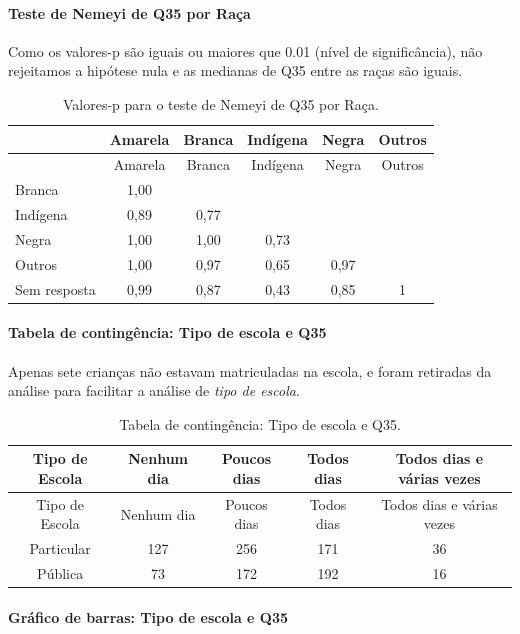 \documentclass[]{article}
\let\oldparagraph\paragraph
\renewcommand{\paragraph}[1]{\oldparagraph{#1}\mbox{}}
\begin{document}
\hypertarget{teste-de-nemeyi-de-q35-por-rauxe7a}{%
\paragraph{Teste de Nemeyi de Q35 por Raça}\label{teste-de-nemeyi-de-q35-por-rauxe7a}}

Como os valores-p são iguais ou maiores que 0.01 (nível de significância), não rejeitamos a hipótese nula e as medianas de Q35 entre as raças são iguais.

\begin{longtable}[]{@{}lccccc@{}}
\caption{\label{tab:unnamed-chunk-1291}Valores-p para o teste de Nemeyi de Q35 por Raça.}\tabularnewline
\toprule
& Amarela & Branca & Indígena & Negra & Outros\tabularnewline
\midrule
\endfirsthead
\toprule
& Amarela & Branca & Indígena & Negra & Outros\tabularnewline
\midrule
\endhead
Branca & 1,00 & & & &\tabularnewline
Indígena & 0,89 & 0,77 & & &\tabularnewline
Negra & 1,00 & 1,00 & 0,73 & &\tabularnewline
Outros & 1,00 & 0,97 & 0,65 & 0,97 &\tabularnewline
Sem resposta & 0,99 & 0,87 & 0,43 & 0,85 & 1\tabularnewline
\bottomrule
\end{longtable}

\cleardoublepage

\hypertarget{tabela-de-continguxeancia-tipo-de-escola-e-q35}{%
\paragraph{Tabela de contingência: Tipo de escola e Q35}\label{tabela-de-continguxeancia-tipo-de-escola-e-q35}}

Apenas sete crianças não estavam matriculadas na escola, e foram retiradas da análise para facilitar a análise de \emph{tipo de escola}.

\begin{longtable}[]{@{}ccccc@{}}
\caption{\label{tab:unnamed-chunk-1292}Tabela de contingência: Tipo de escola e Q35.}\tabularnewline
\toprule
Tipo de Escola & Nenhum dia & Poucos dias & Todos dias & Todos dias e várias vezes\tabularnewline
\midrule
\endfirsthead
\toprule
Tipo de Escola & Nenhum dia & Poucos dias & Todos dias & Todos dias e várias vezes\tabularnewline
\midrule
\endhead
Particular & 127 & 256 & 171 & 36\tabularnewline
Pública & 73 & 172 & 192 & 16\tabularnewline
\bottomrule
\end{longtable}

\hypertarget{gruxe1fico-de-barras-tipo-de-escola-e-q35}{%
\paragraph{Gráfico de barras: Tipo de escola e Q35}\label{gruxe1fico-de-barras-tipo-de-escola-e-q35}}
\end{document}
